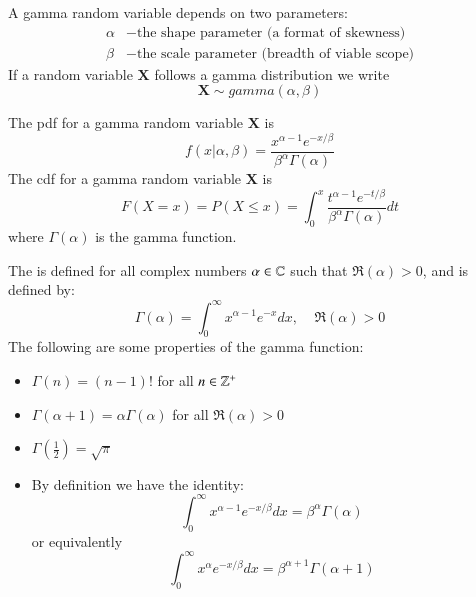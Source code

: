 \documentclass[12pt]{report}
\begin{document}
\begin{defn}{}{}
    A gamma random variable depends on two parameters: \begin{align*}
        \alpha &- \text{the shape parameter (a format of skewness)} \\
        \beta &- \text{the scale parameter (breadth of viable scope)}
    \end{align*}
    If a random variable $\mathbf{X}$ follows a gamma distribution we write $$\mathbf{X}\sim gamma(\alpha,\beta)$$
\end{defn}

\begin{defn}{}{}
    The pdf for a gamma random variable $\mathbf{X}$ is \begin{equation*}
        f(x\vert\alpha,\beta) = \frac{x^{\alpha-1}e^{-x/\beta}}{\beta^{\alpha}\Gamma(\alpha)}
    \end{equation*}
    The cdf for a gamma random variable $\mathbf{X}$ is \begin{equation*}
        F(X = x) = P(X\leq x) = \int_{0}^x\frac{t^{\alpha-1}e^{-t/\beta}}{\beta^{\alpha}\Gamma(\alpha)}dt
    \end{equation*}
    where $\Gamma(\alpha)$ is the gamma function.
\end{defn}

\begin{defn}{}{}
    The  is defined for all complex numbers $\alpha \in \mathbb C$ such that $\mathfrak{R}(\alpha) > 0$, and is defined by: \begin{equation*}
        \Gamma(\alpha) = \int_0^{\infty}x^{\alpha - 1}e^{-x}dx,\;\;\;\;\mathfrak{R}(\alpha) > 0
    \end{equation*}
    The following are some properties of the gamma function: \begin{itemize}
        \item $\Gamma(n) = (n-1)!$ for all $n \in \mathbb Z^+$
        \item $\Gamma(\alpha+1) = \alpha\Gamma(\alpha)$ for all $\mathfrak{R}(\alpha) > 0$
        \item $\Gamma\left(\frac{1}{2}\right) = \sqrt{\pi}$
        \item By definition we have the identity: \begin{equation*}
                \int_0^{\infty}x^{\alpha-1}e^{-x/\beta}dx = \beta^{\alpha}\Gamma(\alpha)
        \end{equation*}
            or equivalently \begin{equation*}
                \int_0^{\infty}x^{\alpha}e^{-x/\beta}dx = \beta^{\alpha+1}\Gamma(\alpha+1)
            \end{equation*}
    \end{itemize}
\end{defn}
\end{document}
